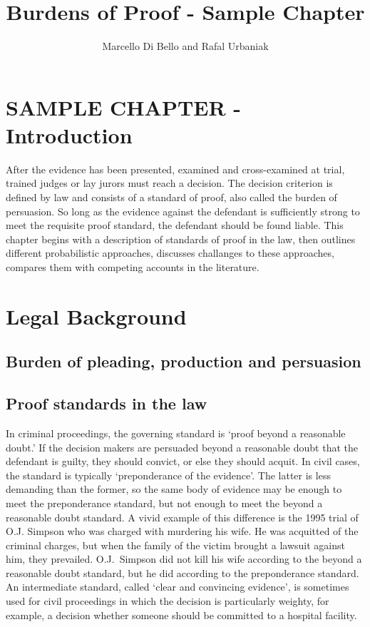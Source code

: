 \documentclass[10pt,dvipsnames]{scrartcl}
\title{Burdens of Proof - Sample Chapter}
\author{Marcello Di Bello and Rafal Urbaniak}
\date{}
\begin{document}
\maketitle

\tableofcontents

\section{SAMPLE CHAPTER -
Introduction}\label{sample-chapter---introduction}

After the evidence has been presented, examined and cross-examined at
trial, trained judges or lay jurors must reach a decision. The decision
criterion is defined by law and consists of a standard of proof, also
called the burden of persuasion. So long as the evidence against the
defendant is sufficiently strong to meet the requisite proof standard,
the defendant should be found liable. This chapter begins with a
description of standards of proof in the law, then outlines different
probabilistic approaches, discusses challanges to these approaches,
compares them with competing accounts in the literature.

\section{Legal Background}\label{legal-background}

\label{subsec:legal-background}

\subsection{Burden of pleading, production and
persuasion}\label{burden-of-pleading-production-and-persuasion}

\subsection{Proof standards in the
law}\label{proof-standards-in-the-law}

In criminal proceedings, the governing standard is `proof beyond a
reasonable doubt.' If the decision makers are persuaded beyond a
reasonable doubt that the defendant is guilty, they should convict, or
else they should acquit. In civil cases, the standard is typically
`preponderance of the evidence'. The latter is less demanding than the
former, so the same body of evidence may be enough to meet the
preponderance standard, but not enough to meet the beyond a reasonable
doubt standard. A vivid example of this difference is the 1995 trial of
O.J. Simpson who was charged with murdering his wife. He was acquitted
of the criminal charges, but when the family of the victim brought a
lawsuit against him, they prevailed. O.J.~Simpson did not kill his wife
according to the beyond a reasonable doubt standard, but he did
according to the preponderance standard. An intermediate standard,
called `clear and convincing evidence', is sometimes used for civil
proceedings in which the decision is particularly weighty, for example,
a decision whether someone should be committed to a hospital facility.
\end{document}
